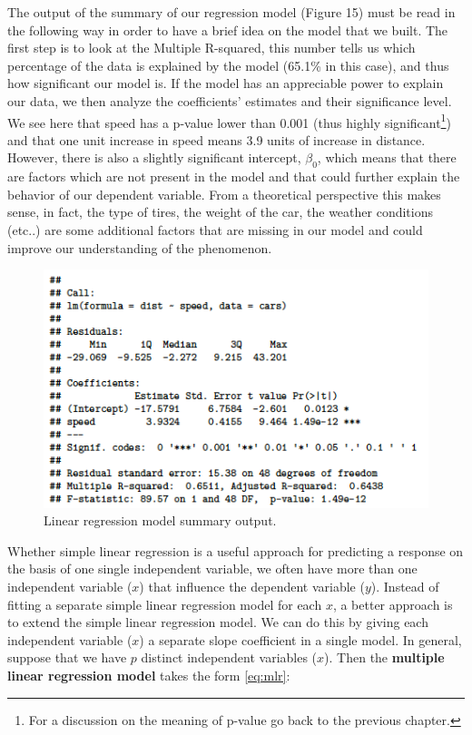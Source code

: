 \documentclass[
]{article}
\begin{document}
The output of the summary of our regression model (Figure 15) must be
read in the following way in order to have a brief idea on the model
that we built. The first step is to look at the Multiple R-squared, this
number tells us which percentage of the data is explained by the model
(65.1\% in this case), and thus how significant our model is. If the
model has an appreciable power to explain our data, we then analyze the
coefficients' estimates and their significance level. We see here that
speed has a p-value lower than 0.001 (thus highly significant\footnote{For a discussion on the meaning of p-value go back to the previous
  chapter.}) and
that one unit increase in speed means 3.9 units of increase in distance.
However, there is also a slightly significant intercept, \(\beta_0\),
which means that there are factors which are not present in the model
and that could further explain the behavior of our dependent variable.
From a theoretical perspective this makes sense, in fact, the type of
tires, the weight of the car, the weather conditions (etc..) are some
additional factors that are missing in our model and could improve our
understanding of the phenomenon.

\begin{figure}[H]

{\centering \includegraphics[width=0.5\linewidth,]{images/Schermata 2022-07-07 alle 17.24.44} 

}

\caption{Linear regression model summary output.}\label{fig:unnamed-chunk-76}
\end{figure}

Whether simple linear regression is a useful approach for predicting a
response on the basis of one single independent variable, we often have
more than one independent variable (\(x\)) that influence the dependent
variable (\(y\)). Instead of fitting a separate simple linear regression
model for each \(x\), a better approach is to extend the simple linear
regression model. We can do this by giving each independent variable
(\(x\)) a separate slope coefficient in a single model. In general,
suppose that we have \(p\) distinct independent variables (\(x\)). Then the
\textbf{multiple linear regression model} takes the form \eqref{eq:mlr}:
\end{document}
